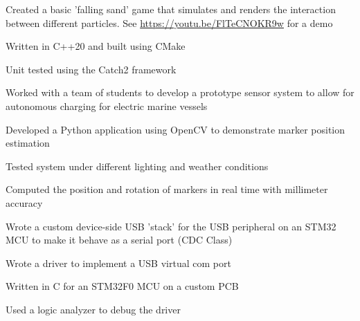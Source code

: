 
{Created a basic 'falling sand' game that simulates and renders the interaction between different particles. See \url{https://youtu.be/FlTeCNOKR9w} for a demo}{
    \item Written in C++20 and built using CMake
    \item Unit tested using the Catch2 framework
}

{Worked with a team of students to develop a prototype sensor system to allow for autonomous charging for electric marine vessels}{
    \item Developed a Python application using OpenCV to demonstrate marker position estimation
    \item Tested system under different lighting and weather conditions
    \item Computed the position and rotation of markers in real time with millimeter accuracy
}

{Wrote a custom device-side USB 'stack' for the USB peripheral on an STM32 MCU to make it behave as a serial port (CDC Class)}{
    \item Wrote a driver to implement a USB virtual com port
    \item Written in C for an STM32F0 MCU on a custom PCB
    \item Used a logic analyzer to debug the driver
}